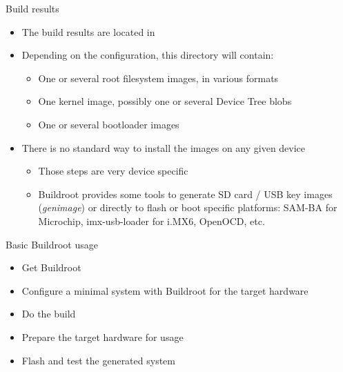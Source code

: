 \begin{frame}{Build results}
  \begin{itemize}
  \item The build results are located in 
  \item Depending on the configuration, this directory will contain:
    \begin{itemize}
    \item One or several root filesystem images, in various formats
    \item One kernel image, possibly one or several Device Tree blobs
    \item One or several bootloader images
    \end{itemize}
  \item There is no standard way to install the images on any given
    device
    \begin{itemize}
    \item Those steps are very device specific
    \item Buildroot provides some tools to generate SD card / USB key
      images ({\em genimage}) or directly to flash or boot specific
      platforms: SAM-BA for Microchip, imx-usb-loader for i.MX6, OpenOCD,
      etc.
    \end{itemize}
  \end{itemize}
\end{frame}

\setuplabframe
{Basic Buildroot usage}
{
  \begin{itemize}
  \item Get Buildroot
  \item Configure a minimal system with Buildroot for the target
    hardware
  \item Do the build
  \item Prepare the target hardware for usage
  \item Flash and test the generated system
  \end{itemize}
}
